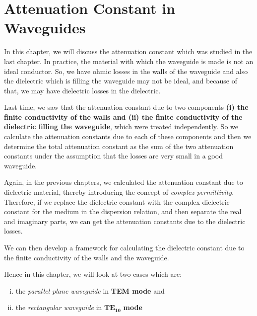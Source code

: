 \chapter{Attenuation Constant in Waveguides}\label{lec:lec42}
In this chapter, we will discuss the attenuation constant which was studied in the last chapter. In practice, the material with which the waveguide is made is not an ideal conductor. So, we have ohmic losses in the walls of the waveguide and also the dielectric which is filling the waveguide may not be ideal, and because of that, we may have dielectric losses in the dielectric.

Last time, we saw that the attenuation constant due to two components \textbf{(i) the finite conductivity of the walls and (ii) the finite conductivity of the dielectric filling the waveguide}, which were treated independently. So we calculate the attenuation constants due to each of these components and then we determine the total attenuation constant as the sum of the two attenuation constants under the assumption that the losses are very small in a good waveguide.

Again, in the previous chapters, we calculated the attenuation constant due to dielectric material, thereby introducing the concept of \emph{complex permittivity}. Therefore, if we replace the dielectric constant with the complex dielectric constant for the medium in the dispersion relation, and then separate the real and imaginary parts, we can get the attenuation constants due to the dielectric losses.

We can then develop a framework for calculating the dielectric constant due to the finite conductivity of the walls and the waveguide.

Hence in this chapter, we will look at two cases which are:
\begin{enumerate}[(i)]
\item the \emph{parallel plane waveguide} in \textbf{TEM mode} and
\item the \emph{rectangular waveguide} in $\boldsymbol{TE_{10}}$ \textbf{mode}
\end{enumerate}


